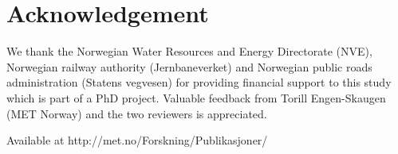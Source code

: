 \documentclass[12pt,a4paper,english]{article}
\begin{document}
\section{Acknowledgement}

We thank the Norwegian Water Resources and Energy Directorate (NVE), Norwegian railway authority (Jernbaneverket) and Norwegian public roads administration (Statens vegvesen) for providing financial support to this study which is part of a PhD project. Valuable feedback from Torill Engen-Skaugen (MET Norway) and the two reviewers is appreciated.



\vspace{10mm}
\noindent*Available at http://met.no/Forskning/Publikasjoner/
\end{document}
